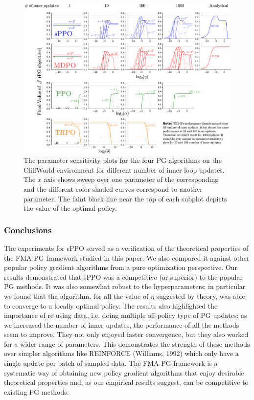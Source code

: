 \documentclass[a4paper, 10pt]{article}
\begin{document}
\begin{figure}[!bp]
  \centering
  \includegraphics[scale=0.45]{tabular_figures/sensitivity.pdf}
  \caption{The parameter sensitivity plots for the four PG algorithms on the CliffWorld environment for different number of inner loop updates. The $x$ axis shows sweep over one parameter of the corresponding and the different color shaded curves correspond to another parameter. The faint black line near the top of each subplot depicts the value of the optimal policy.}
  \label{fig: sensitivity}
\end{figure}

\subsubsection{Conclusions}
The experiments for sPPO served as a verification of the theoretical properties of the FMA-PG framework studied in this paper. We also compared it against other popular policy gradient algorithms from a pure optimization perspective. Our results demonstrated that sPPO was a competitive (or superior) to the popular PG methods. It was also somewhat robust to the hyperparameters; in particular we found that tha algorithm, for all the value of $\eta$ suggested by theory, was able to converge to a locally optimal policy. The results also highlighted the importance of re-using data, i.e. doing multiple off-policy type of PG updates: as we increased the number of inner updates, the performance of all the methods seem to improve. They not only enjoyed faster convergence, but they also worked for a wider range of parameters. This demonstrates the strength of these methods over simpler algorithms like REINFORCE (Williams, 1992) which only have a single update per batch of sampled data. The FMA-PG framework is a systematic way of obtaining new policy gradient algorithms that enjoy desirable theoretical properties and, as our empirical results suggest, can be competitive to existing PG methods.
\end{document}
